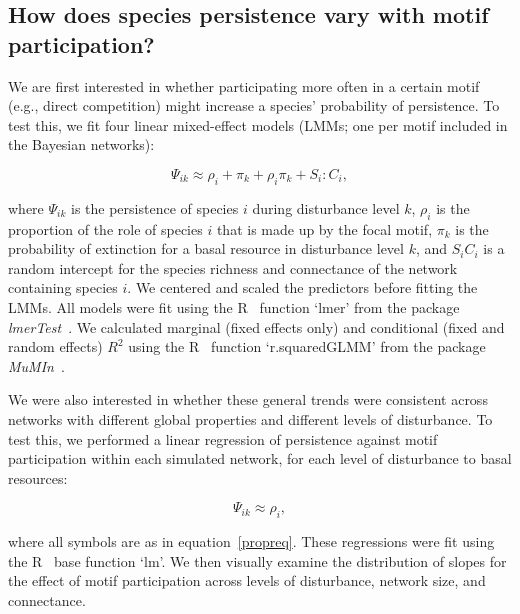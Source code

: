 \documentclass[12pt]{article}
\begin{document}
\begin{spacing}{2.0}
    \subsection{How does species persistence vary with motif participation?}

        We are first interested in whether participating more often in a certain motif (e.g., direct competition) might increase a species' probability of persistence.
        To test this, we fit four linear mixed-effect models (LMMs; one per motif included in the Bayesian networks):

        \begin{equation}
            \Psi_{ik} \approx \rho_{i} + \pi_{k} + \rho_{i}\pi_{k} +
            S_{i}:C_{i} ,
            \label{propreq}
        \end{equation}


        \noindent where $\Psi_{ik}$ is the persistence of species $i$ during disturbance level $k$, $\rho_{i}$ is the proportion of the role of species $i$ that is made up by the focal motif, $\pi_{k}$ is the probability of extinction for a basal resource in disturbance level $k$, and $S_{i}C_{i}$ is a random intercept for the species richness and connectance of the network containing species $i$.
        We centered and scaled the predictors before fitting the LMMs.
        All models were fit using the R~\citep{R} function `lmer' from the package \emph{lmerTest}~\citep{lmerTest}.
        We calculated marginal (fixed effects only) and conditional (fixed and random effects) $R^2$ using the R~\citep{R} function `r.squaredGLMM' from the package \emph{MuMIn}~\citep{MuMIn}.

        
        We were also interested in whether these general trends were consistent across networks with different global properties and different levels of disturbance. 
        To test this, we performed a linear regression of persistence against motif participation within each simulated network, for each level of disturbance to basal resources:

        \begin{equation}
            \Psi_{ik} \approx \rho_{i} ,
            \label{mineq}
        \end{equation}

        where all symbols are as in equation~\ref{propreq}.
        These regressions were fit using the R~\citep{R} base function `lm'.
        We then visually examine the distribution of slopes for the effect of motif participation across levels of disturbance, network size, and connectance. 



\end{spacing}
\end{document}
